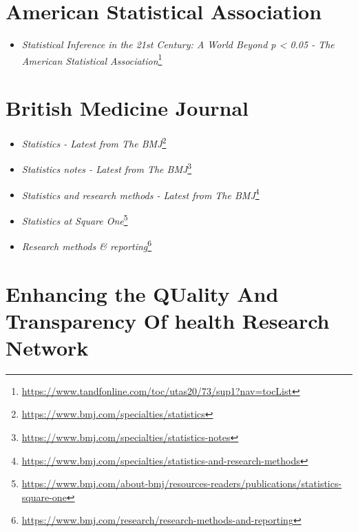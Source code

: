\documentclass[
  a4paper,
]{book}
\providecommand{\tightlist}{%
  \setlength{\itemsep}{0pt}\setlength{\parskip}{0pt}}
\renewcommand{\href}[2]{#2\footnote{\url{#1}}}
\begin{document}
\hypertarget{american-statistical-association}{%
\section*{American Statistical Association}\label{american-statistical-association}}

\begin{itemize}
\tightlist
\item
  \href{https://www.tandfonline.com/toc/utas20/73/sup1?nav=tocList}{\emph{Statistical Inference in the 21st Century: A World Beyond p \textless{} 0.05 - The American Statistical Association}}
\end{itemize}

\hypertarget{british-medicine-journal}{%
\section*{British Medicine Journal}\label{british-medicine-journal}}

\begin{itemize}
\item
  \href{https://www.bmj.com/specialties/statistics}{\emph{Statistics - Latest from The BMJ}}
\item
  \href{https://www.bmj.com/specialties/statistics-notes}{\emph{Statistics notes - Latest from The BMJ}}
\item
  \href{https://www.bmj.com/specialties/statistics-and-research-methods}{\emph{Statistics and research methods - Latest from The BMJ}}
\item
  \href{https://www.bmj.com/about-bmj/resources-readers/publications/statistics-square-one}{\emph{Statistics at Square One}}
\item
  \href{https://www.bmj.com/research/research-methods-and-reporting}{\emph{Research methods \& reporting}}
\end{itemize}

\hypertarget{enhancing-the-quality-and-transparency-of-health-research-network}{%
\section*{Enhancing the QUality And Transparency Of health Research Network}\label{enhancing-the-quality-and-transparency-of-health-research-network}}
\end{document}
